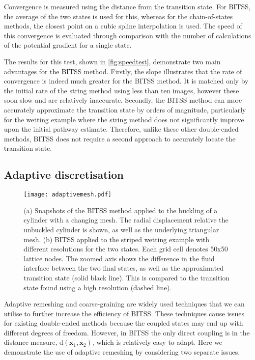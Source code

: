 \documentclass[twocolumn,10pt]{revtex4-2}
\begin{document}
Convergence is measured using the distance from the transition state.
For BITSS, the average of the two states is used for this, whereas for the chain-of-states methods, the closest point on a cubic spline interpolation is used.
The speed of this convergence is evaluated through comparison with the number of calculations of the potential gradient for a single state.

The results for this test, shown in \cref{fig:speedtest}, demonstrate two main advantages for the BITSS method.
Firstly, the slope illustrates that the rate of convergence is indeed much greater for the BITSS method.
It is matched only by the initial rate of the string method using less than ten images, however these soon slow and are relatively inaccurate.
Secondly, the BITSS method can more accurately approximate the transition state by orders of magnitude, particularly for the wetting example where the string method does not significantly improve upon the initial pathway estimate.
Therefore, unlike these other double-ended methods, BITSS does not require a second approach to accurately locate the transition state.


\subsection{Adaptive discretisation}
\begin{figure}[tb]
  \texttt{[image: adaptivemesh.pdf]}
  \caption{\label{fig:adaptivemesh}
    (a) Snapshots of the BITSS method applied to the buckling of a cylinder with a changing mesh.
        The radial displacement relative the unbuckled cylinder is shown, as well as the underlying triangular mesh.
    (b) BITSS applied to the striped wetting example with different resolutions for the two states.
        Each grid cell denotes 50x50 lattice nodes.
        The zoomed axis shows the difference in the fluid interface between the two final states, as well as the approximated transition state (solid black line).
        This is compared to the transition state found using a high resolution (dashed line).
  }
\end{figure}

Adaptive remeshing and coarse-graining are widely used techniques that we can utilise to further increase the efficiency of BITSS.
These techniques cause issues for existing double-ended methods because the coupled states may end up with different degrees of freedom.
However, in BITSS the only direct coupling is in the distance measure, $\mathrm{d}(\bm{x}_1,\bm{x}_2)$, which is relatively easy to adapt.
Here we demonstrate the use of adaptive remeshing by considering two separate issues.
\end{document}
